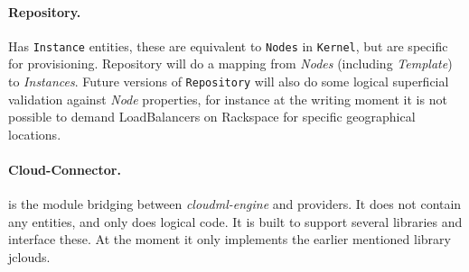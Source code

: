 \paragraph{Repository.} Has \texttt{Instance} entities, these are equivalent to \texttt{Nodes} in \texttt{Kernel},
but are specific for provisioning. Repository will do a mapping from \emph{Nodes} (including \emph{Template})
to \emph{Instances}. Future versions of \texttt{Repository} will also do some logical superficial validation
against \emph{Node} properties, for instance at the writing moment it is not possible to 
demand LoadBalancers on Rackspace for specific geographical locations.

\paragraph{Cloud-Connector.} is the module bridging between \emph{cloudml-engine} and providers.
It does not contain any entities, and only does logical code. 
It is built to support several libraries and interface these. At the moment it only implements the earlier
mentioned library jclouds.
